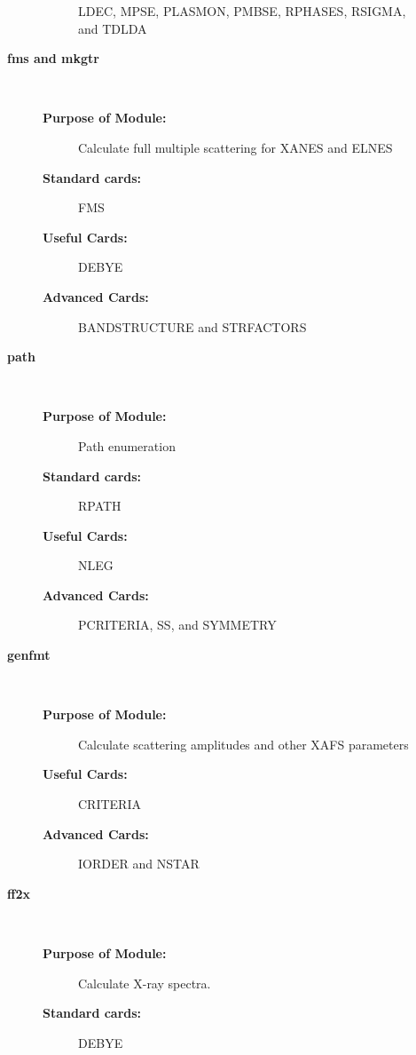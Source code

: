 \documentclass[11pt,oneside]{report} %
\renewcommand{\htmlref}[2]{\hyperlink{#2}{#1}}
\newcommand{\module}[1]{\textrm{\bf{#1}}}
\renewcommand{\htmlref}[2]{{#1}} %
\begin{document}
\begin{description}
\begin{description}
\begin{description}
    \htmlref{LDEC}{card:lde},
    \htmlref{MPSE}{card:mps},
    \htmlref{PLASMON}{card:mps},
    \htmlref{PMBSE}{card:pmb},
    \htmlref{RPHASES}{card:rph},
    \htmlref{RSIGMA}{card:rsi},
    and \htmlref{TDLDA}{card:tdl}
  \end{description}
\item[{\large\module{fms and mkgtr}}]\dotfill\  
  \begin{description}
  \item[\textbf{Purpose of Module:}] Calculate full multiple
    scattering for XANES and ELNES
  \item[\textbf{Standard cards:}] \htmlref{FMS}{card:fms}
  \item[\textbf{Useful Cards:}] \htmlref{DEBYE}{card:deb1}
  \item[\textbf{Advanced Cards:}] \htmlref{BANDSTRUCTURE}{card:ban}
    and \htmlref{STRFACTORS}{card:stf}
  \end{description}
\item[{\large\module{path}}]\dotfill\  
  \begin{description}
  \item[\textbf{Purpose of Module:}] Path enumeration
  \item[\textbf{Standard cards:}] \htmlref{RPATH}{card:rpa}
  \item[\textbf{Useful Cards:}] \htmlref{NLEG}{card:nle}
  \item[\textbf{Advanced Cards:}] 
  \htmlref{PCRITERIA}{card:pcr},
  \htmlref{SS}{card:ss}, 
  and \htmlref{SYMMETRY}{card:sym}
  \end{description}
\item[{\large\module{genfmt}}]\dotfill\  
  \begin{description}
  \item[\textbf{Purpose of Module:}] Calculate scattering amplitudes
    and other XAFS parameters
  \item[\textbf{Useful Cards:}] \htmlref{CRITERIA}{card:cri}
  \item[\textbf{Advanced Cards:}] \htmlref{IORDER}{card:ior} and
    \htmlref{NSTAR}{card:nst}
  \end{description}
\item[{\large\module{ff2x}}]\dotfill\ 
  \begin{description}
  \item[\textbf{Purpose of Module:}] Calculate X-ray spectra. 
  \item[\textbf{Standard cards:}] \htmlref{DEBYE}{card:deb2}

\end{description}
\end{description}
\end{description}
\end{document}
